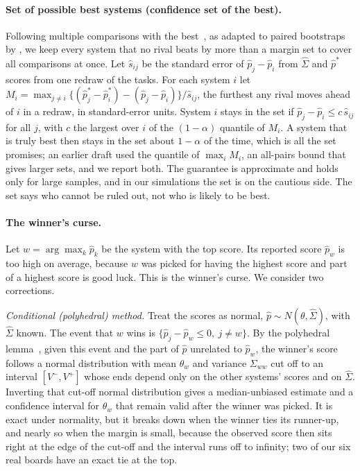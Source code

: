 \documentclass[11pt]{article}
\renewcommand{\hat}{\widehat}
\begin{document}
\paragraph{Set of possible best systems (confidence set of the best).}
Following multiple comparisons with the best~\citep{hsu1981mcb}, as adapted to paired bootstraps by \citet{jain2026lottery}, we keep every system that no rival beats by more than a margin set to cover all comparisons at once.
Let $\hat s_{ij}$ be the standard error of $\hat p_j-\hat p_i$ from $\hat\Sigma$ and $\hat p^*$ scores from one redraw of the tasks.
For each system $i$ let $M_i=\max_{j\ne i}\{(\hat p_j^*-\hat p_i^*)-(\hat p_j-\hat p_i)\}/\hat s_{ij}$, the furthest any rival moves ahead of $i$ in a redraw, in standard-error units.
System $i$ stays in the set if $\hat p_j-\hat p_i\le c\,\hat s_{ij}$ for all $j$, with $c$ the largest over $i$ of the $(1-\alpha)$ quantile of $M_i$.
A system that is truly best then stays in the set about $1-\alpha$ of the time, which is all the set promises; an earlier draft used the quantile of $\max_i M_i$, an all-pairs bound that gives larger sets, and we report both.
The guarantee is approximate and holds only for large samples, and in our simulations the set is on the cautious side.
The set says who cannot be ruled out, not who is likely to be best.

\paragraph{The winner's curse.}
Let $w=\arg\max_k\hat p_k$ be the system with the top score.
Its reported score $\hat p_w$ is too high on average, because $w$ was picked for having the highest score and part of a highest score is good luck.
This is the winner's curse.
We consider two corrections.

\emph{Conditional (polyhedral) method.}
Treat the scores as normal, $\hat p\sim N(\theta,\hat\Sigma)$, with $\hat\Sigma$ known.
The event that $w$ wins is $\{\hat p_j-\hat p_w\le 0,\ j\ne w\}$.
By the polyhedral lemma~\citep{lee2016exact,fithian2014optimal}, given this event and the part of $\hat p$ unrelated to $\hat p_w$, the winner's score follows a normal distribution with mean $\theta_w$ and variance $\Sigma_{ww}$ cut off to an interval $[V^-,V^+]$ whose ends depend only on the other systems' scores and on $\hat\Sigma$.
Inverting that cut-off normal distribution gives a median-unbiased estimate and a confidence interval for $\theta_w$ that remain valid after the winner was picked.
It is exact under normality, but it breaks down when the winner ties its runner-up, and nearly so when the margin is small, because the observed score then sits right at the edge of the cut-off and the interval runs off to infinity; two of our six real boards have an exact tie at the top.
\end{document}
